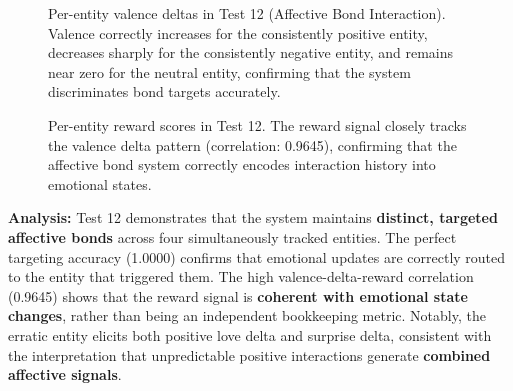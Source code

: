 \documentclass[12pt]{article}
\begin{document}
\begin{figure}[H]
\centering
{}
\caption{Per-entity valence deltas in Test 12 (Affective Bond
Interaction). Valence correctly increases for the consistently
positive entity, decreases sharply for the consistently negative
entity, and remains near zero for the neutral entity, confirming
that the system discriminates bond targets accurately.}
\label{fig:bond_valence}
\end{figure}

\begin{figure}[H]
\centering
{}
\caption{Per-entity reward scores in Test 12. The reward signal
closely tracks the valence delta pattern (correlation: 0.9645),
confirming that the affective bond system correctly encodes
interaction history into emotional states.}
\label{fig:bond_reward}
\end{figure}

\textbf{Analysis:}
Test 12 demonstrates that the system maintains \textbf{distinct,
targeted affective bonds} across four simultaneously tracked entities.
The perfect targeting accuracy (1.0000) confirms that emotional
updates are correctly routed to the entity that triggered them.
The high valence-delta-reward correlation (0.9645) shows that the
reward signal is \textbf{coherent with emotional state changes},
rather than being an independent bookkeeping metric. Notably, the
erratic entity elicits both positive love delta and surprise delta,
consistent with the interpretation that unpredictable positive
interactions generate \textbf{combined affective signals}.
\end{document}
